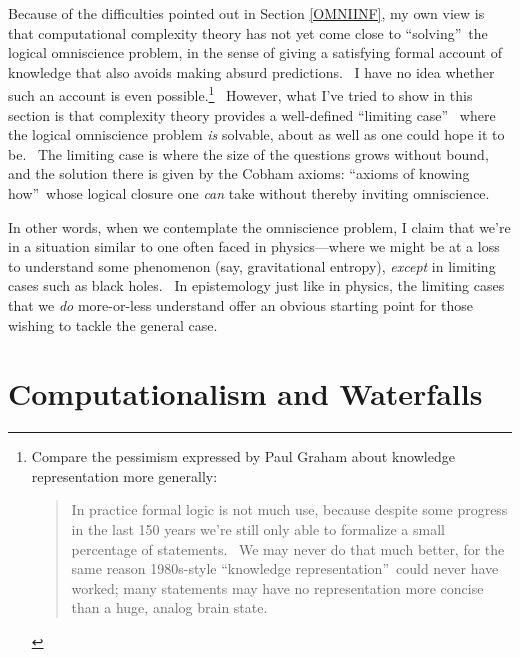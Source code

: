 \documentclass[11pt,onecolumn]{article}%
\begin{document}
Because of the difficulties pointed out in Section \ref{OMNIINF}, my own view
is that computational complexity theory has not yet come close to
\textquotedblleft solving\textquotedblright\ the logical omniscience problem,
in the sense of giving a satisfying formal account of knowledge that also
avoids making absurd predictions. \ I have no idea whether such an account is
even possible.\footnote{Compare the pessimism expressed by Paul Graham
\cite{graham} about knowledge representation more generally:
\par
\begin{quotation}
\noindent In practice formal logic is not much use, because despite some
progress in the last 150 years we're still only able to formalize a small
percentage of statements. \ We may never do that much better, for the same
reason 1980s-style \textquotedblleft knowledge
representation\textquotedblright\ could never have worked; many statements may
have no representation more concise than a huge, analog brain state.
\end{quotation}
} \ However, what I've tried to show in this section is that complexity theory
provides a well-defined \textquotedblleft limiting case\textquotedblright%
\ where the logical omniscience problem \textit{is} solvable, about as well as
one could hope it to be. \ The limiting case is where the size of the
questions grows without bound, and the solution there is given by the Cobham
axioms: \textquotedblleft axioms of knowing how\textquotedblright\ whose
logical closure one \textit{can} take without thereby inviting omniscience.

In other words, when we contemplate the omniscience problem, I claim that
we're in a situation similar to one often faced in physics---where we might be
at a loss to understand some phenomenon (say, gravitational entropy),
\textit{except} in limiting cases such as black holes. \ In epistemology just
like in physics, the limiting cases that we \textit{do} more-or-less
understand offer an obvious starting point for those wishing to tackle the
general case.

\section{Computationalism and Waterfalls\label{WATERFALLS}}
\end{document}
